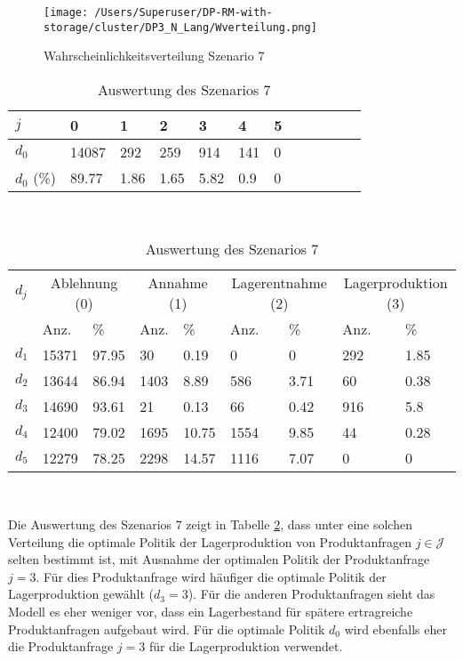 \begin{figure}[h!]
  \begin{center}
    \texttt{[image: /Users/Superuser/DP-RM-with-storage/cluster/DP3\_N\_Lang/Wverteilung.png]}
    \caption{Wahrscheinlichkeitsverteilung Szenario 7}  \label{SB7}
  \end{center}
\end{figure}

\begin{table}[h!]
\renewcommand{\arraystretch}{1.5}
  \begin{center}
    \caption{Auswertung des Szenarios 7}  \label{AS7}
    \vspace*{3mm}
    \begin{tabular}{l l l l l l l l l l l l }  \hline 
         $j$ & 0 & 1  & 2 & 3 & 4  & 5   \\  \hline
$d_{0}$ &  14087 &   292 &   259 &   914 &  141 &  0 \\
$d_{0}$ (\%) &  89.77 &  1.86 &  1.65 &  5.82 &  0.9 &  0 \\
\hline
    \end{tabular} \\[3mm]
        \begin{tabular}{ l l l l l l l l l}   \hline    %
    $d_j$ & \multicolumn{2}{c}{Ablehnung (0)} & \multicolumn{2}{c}{Annahme (1)}  & \multicolumn{2}{c}{Lagerentnahme (2)} & \multicolumn{2}{c}{Lagerproduktion (3)}\\
    & Anz. & \% & Anz. & \% & Anz. & \% & Anz. & \% \\ \hline 
$d_{1}$ &  15371 &  97.95 &    30 &   0.19 &   0 &   0 &  292 &  1.85 \\
$d_{2}$ &  13644 &  86.94 &  1403 &   8.89 &   586 &  3.71 &   60 &  0.38 \\
$d_{3}$ &  14690 &  93.61 &    21 &   0.13 &    66 &  0.42 &  916 &   5.8 \\
$d_{4}$ &  12400 &  79.02 &  1695 &  10.75 &  1554 &  9.85 &   44 &  0.28 \\
$d_{5}$ &  12279 &  78.25 &  2298 &  14.57 &  1116 &  7.07 &  0 &   0 \\
          \hline
   \end{tabular} \\[3mm]
     \end{center}
\end{table}

Die Auswertung des Szenarios 7 zeigt in Tabelle \ref{AS7}, dass unter eine solchen Verteilung die optimale Politik der Lagerproduktion von Produktanfragen $j\in\mathcal{J}$ selten bestimmt ist, mit Ausnahme der optimalen Politik der Produktanfrage $j=3$. Für dies Produktanfrage wird häufiger die optimale Politik der Lagerproduktion gewählt ($d_3=3$). Für die anderen Produktanfragen sieht das Modell es eher weniger vor, dass ein Lagerbestand für spätere ertragreiche Produktanfragen aufgebaut wird. Für die optimale Politik $d_0$ wird ebenfalls eher die Produktanfrage $j=3$ für die Lagerproduktion verwendet.\\[.5cm]

